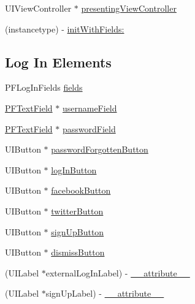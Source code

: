  

 \begin{DoxyCompactItemize}
\item 
U\+I\+View\+Controller $\ast$ \hyperlink{interface_p_f_log_in_view_a9743c6a9acbb86749fe2dc6d50447552}{presenting\+View\+Controller}
\item 
(instancetype) -\/ \hyperlink{interface_p_f_log_in_view_a527a65d9bc4429e6314768e3f88e0ef8}{init\+With\+Fields\+:}
\end{DoxyCompactItemize}
\subsection*{Log In Elements}
\label{_amgrp823f7d999d5c3ea6783fa4e2c28a8de4}%


 

 \begin{DoxyCompactItemize}
\item 
P\+F\+Log\+In\+Fields \hyperlink{interface_p_f_log_in_view_a57c9766d511bca34b7f75fd4bd25a63d}{fields}
\item 
\hyperlink{interface_p_f_text_field}{P\+F\+Text\+Field} $\ast$ \hyperlink{interface_p_f_log_in_view_af6c5b3c59071b1c79442f4781f703ad2}{username\+Field}
\item 
\hyperlink{interface_p_f_text_field}{P\+F\+Text\+Field} $\ast$ \hyperlink{interface_p_f_log_in_view_af2a3676f5d1bfaa67de4b48a6bd358b7}{password\+Field}
\item 
U\+I\+Button $\ast$ \hyperlink{interface_p_f_log_in_view_a15c2c32b5a78348e75399cedb99b6968}{password\+Forgotten\+Button}
\item 
U\+I\+Button $\ast$ \hyperlink{interface_p_f_log_in_view_afcadd6b2ccea1a5f06cd82c79dd675f0}{log\+In\+Button}
\item 
U\+I\+Button $\ast$ \hyperlink{interface_p_f_log_in_view_afbed9acbbd4acf185fce057ab640ab23}{facebook\+Button}
\item 
U\+I\+Button $\ast$ \hyperlink{interface_p_f_log_in_view_a831da16d37f7dc63b2d37d198eaafba0}{twitter\+Button}
\item 
U\+I\+Button $\ast$ \hyperlink{interface_p_f_log_in_view_aca49da3d4d6b0e7aa6264953dc74f47a}{sign\+Up\+Button}
\item 
U\+I\+Button $\ast$ \hyperlink{interface_p_f_log_in_view_a24ee18ef9ab5fe8f9e5e70e9dfd77627}{dismiss\+Button}
\item 
(U\+I\+Label $\ast$external\+Log\+In\+Label) -\/ \hyperlink{interface_p_f_log_in_view_afff2ef2f219c539b4a810564faa5a1ed}{\+\_\+\+\_\+attribute\+\_\+\+\_\+}
\item 
(U\+I\+Label $\ast$sign\+Up\+Label) -\/ \hyperlink{interface_p_f_log_in_view_a9397b636bd66bd2a348950d932c89fe6}{\+\_\+\+\_\+attribute\+\_\+\+\_\+}
\end{DoxyCompactItemize}


